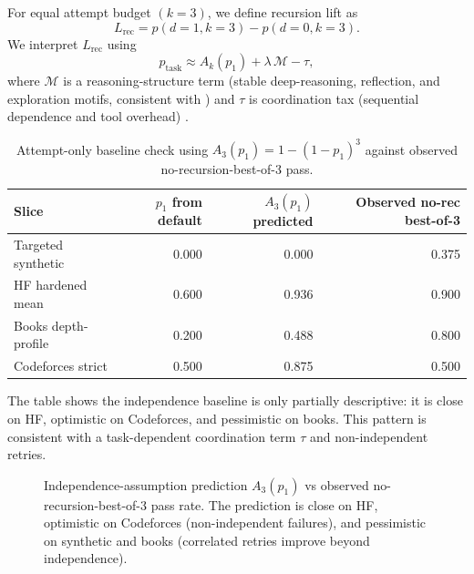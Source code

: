 \documentclass[11pt]{article}
\begin{document}
For equal attempt budget \((k=3)\), we define recursion lift as
\[
L_{\text{rec}} = p(d{=}1,k{=}3) - p(d{=}0,k{=}3).
\]
We interpret \(L_{\text{rec}}\) using
\[
p_{\text{task}} \approx A_k(p_1) + \lambda\,\mathcal{M} - \tau,
\]
where \(\mathcal{M}\) is a reasoning-structure term (stable deep-reasoning, reflection, and exploration motifs, consistent with \cite{chen2026molecular}) and \(\tau\) is coordination tax (sequential dependence and tool overhead) \cite{kim2025scaling}.

\begin{table}[t]
\centering
\caption{Attempt-only baseline check using \(A_3(p_1)=1-(1-p_1)^3\) against observed no-recursion-best-of-3 pass.}
\label{tab:attempt-baseline}
\begin{tabular}{lrrr}
\toprule
Slice & \(p_1\) from default & \(A_3(p_1)\) predicted & Observed no-rec best-of-3 \\
\midrule
Targeted synthetic & 0.000 & 0.000 & 0.375 \\
HF hardened mean & 0.600 & 0.936 & 0.900 \\
Books depth-profile & 0.200 & 0.488 & 0.800 \\
Codeforces strict & 0.500 & 0.875 & 0.500 \\
\bottomrule
\end{tabular}
\end{table}

The table shows the independence baseline is only partially descriptive: it is close on HF, optimistic on Codeforces, and pessimistic on books. This pattern is consistent with a task-dependent coordination term \(\tau\) and non-independent retries.

\begin{figure}[t]
\centering
{}
\caption{Independence-assumption prediction $A_3(p_1)$ vs observed no-recursion-best-of-3 pass rate. The prediction is close on HF, optimistic on Codeforces (non-independent failures), and pessimistic on synthetic and books (correlated retries improve beyond independence).}
\label{fig:predicted-vs-observed}
\end{figure}
\end{document}
